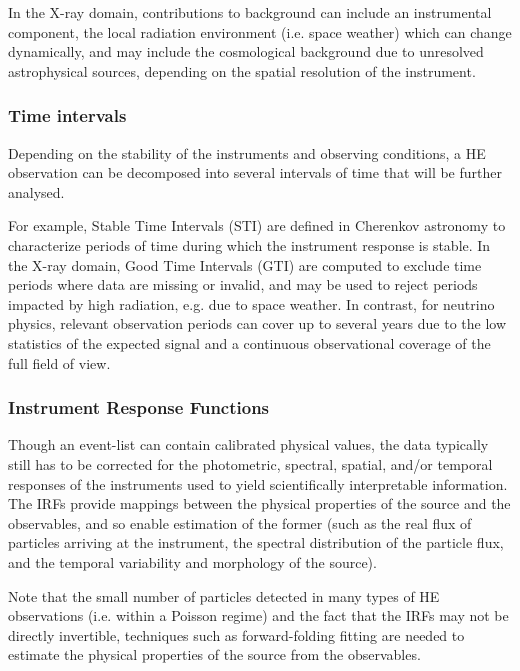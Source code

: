 \documentclass[11pt,a4paper]{ivoa}
\begin{document}
In the X-ray domain, contributions to background can include an instrumental component, the local radiation environment (i.e. space weather) which can change dynamically, and may include the cosmological background due to unresolved astrophysical sources, depending on the spatial resolution of the instrument.


\subsubsection{Time intervals}

Depending on the stability of the instruments and observing conditions, a HE observation can be decomposed into several intervals of time that will be further analysed.

For example, Stable Time Intervals (STI) are defined in Cherenkov astronomy to characterize periods of time during which the instrument response is stable. In the X-ray domain, Good Time Intervals (GTI) are computed to exclude time periods where data are missing or invalid, and may be used to reject periods impacted by high radiation, e.g. due to space weather. In contrast, for neutrino physics, relevant observation periods can cover up to several years due to the low statistics of the expected signal and a continuous observational coverage of the full field of view.


\subsubsection{Instrument Response Functions}

Though an event-list can contain calibrated physical values, the data typically still has to be corrected for the
photometric, spectral, spatial, and/or temporal responses of the instruments used to yield scientifically interpretable
information. The IRFs provide mappings between the physical properties of the source and the observables, and so enable
estimation of the former (such as the real flux of particles arriving at the instrument, the spectral distribution of
the particle flux, and the temporal variability and morphology of the source).

Note that the small number of particles
detected in many types of HE observations (i.e. within a Poisson regime) and the fact that the IRFs may not be directly invertible,
techniques such as forward-folding fitting \citep{mattox:1996} are needed to estimate the physical properties of the
source from the observables.
\end{document}
